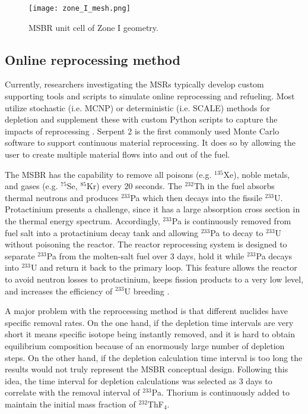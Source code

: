 \documentclass{anstrans}
\begin{document}
\begin{figure}[htbp!] %
        \centering
        \texttt{[image: zone\_I\_mesh.png]}
        \caption{MSBR unit cell of Zone I geometry.}
        \label{fig:zoneI}
\end{figure}

\FloatBarrier
\subsection{Online reprocessing method}

Currently, researchers 
investigating the \glspl{MSR} 
typically develop custom supporting tools and scripts to simulate 
online reprocessing and refueling. Most utilize stochastic (i.e. 
\gls{MCNP}) or deterministic (i.e. SCALE) methods for depletion and supplement 
these with custom Python scripts to capture the impacts of reprocessing 
\cite{jeong_equilibrium_2016,park_whole_2015}. Serpent 2 is the 
first commonly used Monte Carlo software to support continuous material 
reprocessing. It does so by allowing the user to 
create multiple material flows into and out of the fuel.

The \gls{MSBR} has the capability to remove all poisons
(e.g. 
$^{135}$Xe), noble metals, and gases (e.g. $^{75}$Se, $^{85}$Kr) 
every 20 seconds. The $^{232}$Th in the fuel absorbs thermal 
neutrons and produces $^{233}$Pa which then decays into the fissile $^{233}$U. 
Protactinium presents a challenge, since it has a large absorption cross section in the thermal 
energy spectrum. Accordingly, $^{233}$Pa is continuously removed from fuel salt 
into a protactinium decay tank and allowing $^{233}$Pa to decay to $^{233}$U without 
poisoning the reactor. The reactor reprocessing system is designed to separate 
$^{233}$Pa from the molten-salt fuel over 3 days, hold it while $^{233}$Pa 
decays into $^{233}$U 
and return it back to the primary loop. This feature allows the reactor to 
avoid neutron losses to protactinium, keeps fission products to a very low level, and 
increases the efficiency of $^{233}$U breeding \cite{robertson_conceptual_1971}.

A major problem with the reprocessing method is that different nuclides have 
specific removal rates. On the one hand, if the depletion time intervals are 
very short it means specific isotope being instantly removed, and it is hard to 
obtain equilibrium composition because of an enormously large number of depletion 
steps. On the other hand, if the depletion calculation time interval is too 
long the results would not truly represent the \gls{MSBR} conceptual design. 
Following this idea, the time interval for depletion calculations was selected 
as 3 days to correlate with the removal interval of $^{233}$Pa. Thorium is 
continuously added to 
maintain the initial mass fraction of $^{232}$ThF$_4$.
\end{document}
